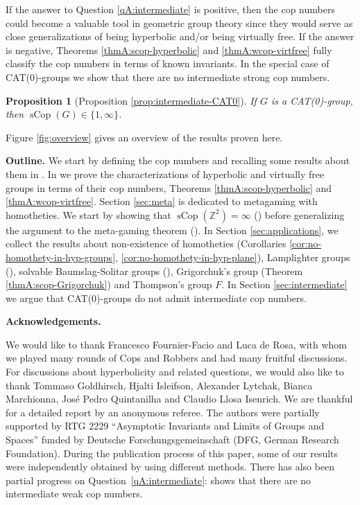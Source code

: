 \documentclass{amsart}
\newtheorem{propositionA}[theoremA]{Proposition}
\theoremstyle{definition}
\theoremstyle{remark}
\theoremstyle{remark}
\theoremstyle{definition}
\newcommand{\sCop}{\operatorname{sCop}}
\begin{document}
If the answer to Question \ref{qA:intermediate} is positive, then the cop numbers could become a valuable tool in geometric group theory since they would serve as close generalizations of being hyperbolic and/or being virtually free. If the answer is negative, Theorems \ref{thmA:scop-hyperbolic} and \ref{thmA:wcop-virtfree} fully classify the cop numbers in terms of known invariants. In the special case of CAT(0)-groups we show that there are no intermediate strong cop numbers.
\begin{propositionA}[Proposition \ref{prop:intermediate-CAT0}]\label{propA:intermediate-CAT0}
    If $G$ is a CAT(0)-group, then $\sCop(G) \in \{ 1,\infty \} $.
\end{propositionA}
Figure \ref{fig:overview} gives an overview of the results proven here.

\medskip
\textbf{Outline.}
We start by defining the cop numbers and recalling some results about them in . In  we prove the characterizations of hyperbolic and virtually free groups in terms of their cop numbers, Theorems \ref{thmA:scop-hyperbolic} and \ref{thmA:wcop-virtfree}. Section \ref{sec:meta} is dedicated to metagaming with homotheties. We start by showing that $\sCop(\mathbb{Z}^2) = \infty$ () before generalizing the argument to the meta-gaming theorem (). In Section \ref{sec:applications}, we collect the results about non-existence of homotheties (Corollaries \ref{cor:no-homothety-in-hyp-groups}, \ref{cor:no-homothety-in-hyp-plane}), Lamplighter groups (), solvable Baumslag-Solitar groups (), Grigorchuk's group (Theorem \ref{thmA:scop-Grigorchuk}) and Thompson's group $F$. In Section \ref{sec:intermediate} we argue that CAT(0)-groups do not admit intermediate cop numbers.

\medskip
\textbf{Acknowledgements.}  %

We would like to thank Francesco Fournier-Facio and Luca de Rosa, with whom we played many rounds of Cops and Robbers and had many fruitful discussions. For discussions about hyperbolicity and related questions, we would also like to thank Tommaso Goldhirsch, Hjalti Isleifson, Alexander Lytchak, Bianca Marchionna, Jos\'e Pedro Quintanilha and Claudio Llosa Isenrich. We are thankful for a detailed report by an anonymous referee.
The authors were partially supported by RTG 2229 ``Asymptotic Invariants and Limits of Groups and Spaces'' funded by Deutsche Forschungsgemeinschaft (DFG, German Research Foundation).
During the publication process of this paper, some of our results were independently obtained by \cite{EGG25arxiv} using different methods. There has also been partial progress on Question~\ref{qA:intermediate}: \cite{Leh25arxiv} shows that there are no intermediate weak cop numbers.
\end{document}
